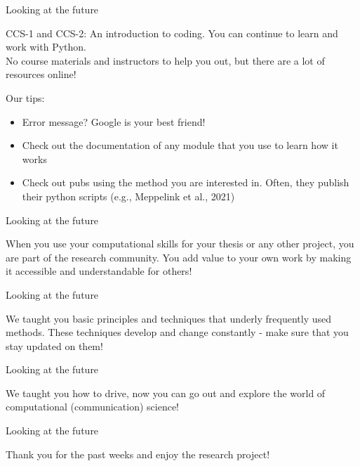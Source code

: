 \documentclass[compress]{beamer}
\begin{document}
\begin{frame}{Looking at the future} 
	
	CCS-1 and CCS-2: An introduction to coding. You can continue to learn and work with Python.\\
	No course materials and instructors to help you out, but there are a lot of resources online!\\
\begin{alertblock}{Our tips:}
	\begin{itemize}
		\item Error message? Google is your best friend!
		\item Check out the documentation of any module that you use to learn how it works
		\item Check out pubs using the method you are interested in. Often, they publish their python scripts (e.g., Meppelink et al., 2021)
	\end{itemize}
\end{alertblock}	
\end{frame}


\begin{frame}{Looking at the future} 
	
When you use your computational skills for your thesis or any other project, you are part of the research community. You add value to your own work by making it accessible and understandable for others!
	
\end{frame}


\begin{frame}{Looking at the future} 
	
We taught you basic principles and techniques that underly frequently used methods. These techniques develop and change constantly - make sure that you stay updated on them!
	
	
\end{frame}



\begin{frame}{Looking at the future} 
	
We taught you how to drive, now you can go out and explore the world of computational (communication) science!
	
\end{frame}


\begin{frame}{Looking at the future} 
	
Thank you for the past weeks and enjoy the research project!
	
\end{frame}
\end{document}
